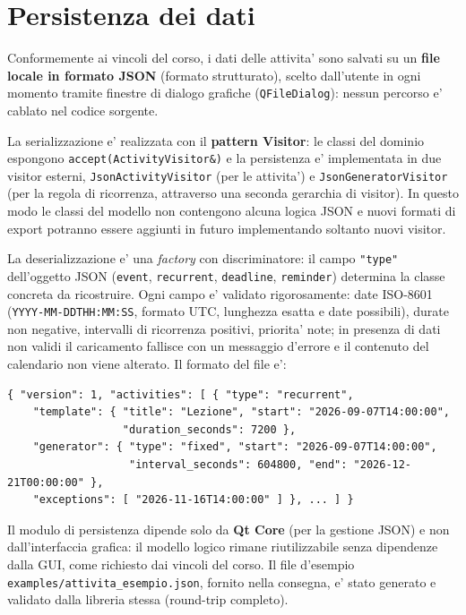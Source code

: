 \documentclass[10pt,a4paper]{article}
\begin{document}
\section{Persistenza dei dati}

Conformemente ai vincoli del corso, i dati delle attivita' sono salvati su un
\textbf{file locale in formato JSON} (formato strutturato), scelto dall'utente
in ogni momento tramite finestre di dialogo grafiche (\texttt{QFileDialog}):
nessun percorso e' cablato nel codice sorgente.

La serializzazione e' realizzata con il \textbf{pattern Visitor}: le classi del
dominio espongono \texttt{accept(ActivityVisitor\&)} e la persistenza e'
implementata in due visitor esterni, \texttt{JsonActivityVisitor} (per le
attivita') e \texttt{JsonGeneratorVisitor} (per la regola di ricorrenza,
attraverso una seconda gerarchia di visitor). In questo modo le classi del
modello non contengono alcuna logica JSON e nuovi formati di export potranno
essere aggiunti in futuro implementando soltanto nuovi visitor.

La deserializzazione e' una \emph{factory} con discriminatore: il campo
\texttt{"type"} dell'oggetto JSON (\texttt{event}, \texttt{recurrent},
\texttt{deadline}, \texttt{reminder}) determina la classe concreta da
ricostruire. Ogni campo e' validato rigorosamente: date ISO-8601
(\texttt{YYYY-MM-DDTHH:MM:SS}, formato UTC, lunghezza esatta e date possibili),
durate non negative, intervalli di ricorrenza positivi, priorita' note; in
presenza di dati non validi il caricamento fallisce con un messaggio d'errore
e il contenuto del calendario non viene alterato. Il formato del file e':

\begin{verbatim}
{ "version": 1, "activities": [ { "type": "recurrent",
    "template": { "title": "Lezione", "start": "2026-09-07T14:00:00",
                  "duration_seconds": 7200 },
    "generator": { "type": "fixed", "start": "2026-09-07T14:00:00",
                   "interval_seconds": 604800, "end": "2026-12-21T00:00:00" },
    "exceptions": [ "2026-11-16T14:00:00" ] }, ... ] }
\end{verbatim}

Il modulo di persistenza dipende solo da \textbf{Qt Core} (per la gestione
JSON) e non dall'interfaccia grafica: il modello logico rimane riutilizzabile
senza dipendenze dalla GUI, come richiesto dai vincoli del corso. Il file
d'esempio \texttt{examples/attivita\_esempio.json}, fornito nella consegna,
e' stato generato e validato dalla libreria stessa (round-trip completo).
\end{document}
